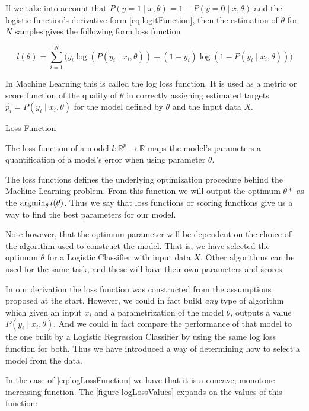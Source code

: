 If we take into account that $P(y=1 \mid x,\theta) = 1 - P(y=0 \mid x,\theta)$ and the logistic function's derivative form \cref{eq:logitFunction}, then the estimation of $\theta$ for $N$ samples gives the following form
loss function

\begin{equation}\label{eq:logLossFunction}
l(\theta) = \sum_{i=1}^N \big(y_i \log(P(y_i \mid x_i,\theta)) + (1-y_i)\log(1 - P(y_i \mid x_i,\theta) ) \big)
\end{equation}

In Machine Learning this is called the log loss function. It is used as a metric or score function of the quality of $\theta$ in correctly assigning estimated targets $ {\hat{p_i}} = P(y_i \mid x_i,\theta)$ for the model defined by $\theta$ and the input data $X$.

\begin{definition}{Loss Function}

The loss function of a model $l: \mathbb{R}^{ p} \rightarrow  \mathbb{R} $ maps the model's parameters a quantification of a model's error when using parameter $\theta$.
\end{definition}

The loss functions defines the underlying optimization procedure behind the Machine Learning problem. From this function we will output the optimum $\theta*$ as the $\operatorname*{argmin}_{\theta} l(\theta) $. Thus we say that loss functions or scoring functions give us a way to find the best parameters for our model.

Note however, that the optimum parameter will be dependent on the choice of the algorithm used to construct the model. That is, we have selected the optimum $\theta$ for a Logistic Classifier with input data $X$. Other algorithms can be used for the same task, and these will have their own parameters and scores.

In our derivation the loss function was constructed from the assumptions proposed at the start. However, we could in fact build \textit{any} type of algorithm which given an input $x_i$ and a parametrization of the model $\theta$, outputs a value $P(y_i \mid x_i,\theta)$. And we could in fact compare the performance of that model to the one built by a Logistic Regression Classifier by using the same log loss function for both. Thus we have introduced a way of determining how to select a model from the data.

In the case of \cref{eq:logLossFunction} we have that it is a concave, monotone increasing function. The \cref{figure-logLossValues} expands on the values of this function:

